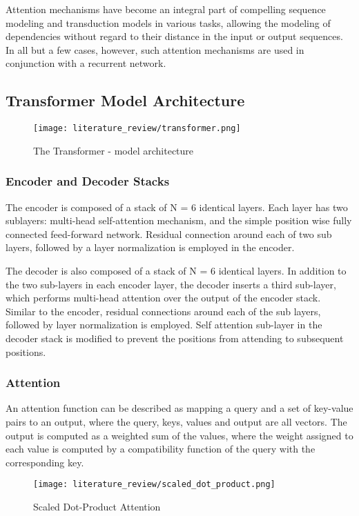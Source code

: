 Attention mechanisms have become an integral part of compelling sequence modeling and transduction models in various tasks, allowing the modeling of dependencies without regard to their distance in the input or output sequences. In all but a few cases, however, such attention mechanisms are used in conjunction with a recurrent network.

\subsection{Transformer Model Architecture}
\begin{figure}[H]
    \centering
    \texttt{[image: literature\_review/transformer.png]}
    \caption{The Transformer - model architecture}
    \label{fig:Transformer Model Architecture}
\end{figure}

\subsubsection{Encoder and Decoder Stacks}
The encoder is composed of a stack of N = 6 identical layers. Each layer has two sublayers: multi-head self-attention mechanism, and the simple position wise fully connected feed-forward network. Residual connection around each of two sub layers, followed by a layer normalization is employed in the encoder. 

The decoder is also composed of a stack of N = 6 identical layers. In addition to the two sub-layers in each encoder layer, the decoder inserts a third sub-layer, which performs multi-head attention over the output of the encoder stack. Similar to the encoder, residual connections around each of the sub layers, followed by layer normalization is employed. Self attention sub-layer in the decoder stack is modified to prevent the positions from attending to subsequent positions.

\subsubsection{Attention}
An attention function can be described as mapping a query and a set of key-value pairs to an output, where the query, keys, values and output are all vectors. The output is computed as a weighted sum of the values, where the weight assigned to each value is computed by a compatibility function of the query with the corresponding key. 

\begin{figure}[H]
    \centering
    \texttt{[image: literature\_review/scaled\_dot\_product.png]}
    \caption{Scaled Dot-Product Attention}
    \label{fig:Scaled Dot-Product Attention}
\end{figure}

